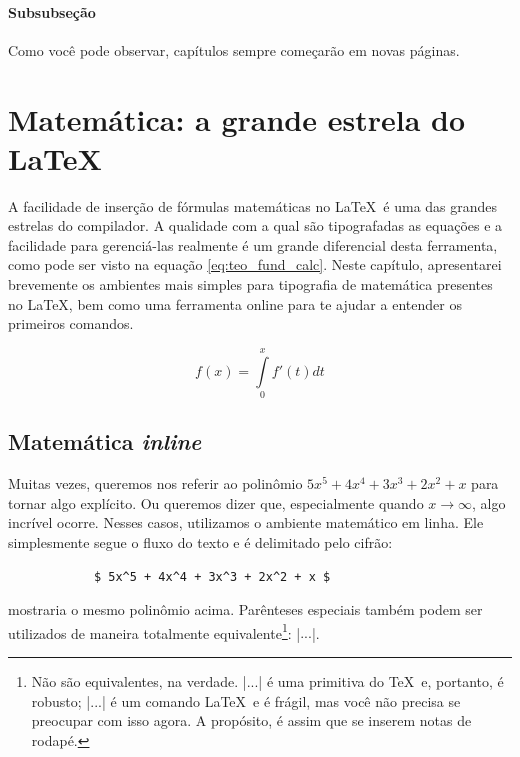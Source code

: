 \documentclass[12pt,oneside,a4paper,english,brazil]{abntex2}
\begin{document}
             \subsubsection{Subsubseção}
                \lipsum[3] %
                
                Como você pode observar, capítulos sempre começarão em novas páginas.


\chapter{Matemática: a grande estrela do \LaTeX}

    A facilidade de inserção de fórmulas matemáticas no \LaTeX\ é uma das grandes estrelas do compilador. A qualidade com a qual são tipografadas as equações e a facilidade para gerenciá-las realmente é um grande diferencial desta ferramenta, como pode ser visto na equação \eqref{eq:teo_fund_calc}. Neste capítulo, apresentarei brevemente os ambientes mais simples para tipografia de matemática presentes no \LaTeX, bem como uma ferramenta online para te ajudar a entender os primeiros comandos.
    
    \begin{equation}\label{eq:teo_fund_calc}
    f(x) = \int\limits_{0}^{x} f'(t) dt
    \end{equation}

    \section{Matemática \emph{inline}}
    
        Muitas vezes, queremos nos referir ao polinômio $ 5x^5 + 4x^4 + 3x^3 + 2x^2 + x $ para tornar algo explícito. Ou queremos dizer que, especialmente quando $ x \to \infty $, algo incrível ocorre. Nesses casos, utilizamos o ambiente matemático em linha. Ele simplesmente segue o fluxo do texto e é delimitado pelo cifrão: 
        \begin{verbatim}
            $ 5x^5 + 4x^4 + 3x^3 + 2x^2 + x $
        \end{verbatim}
        mostraria o mesmo polinômio acima. Parênteses especiais também podem ser utilizados de maneira totalmente equivalente\footnote{Não são equivalentes, na verdade. \ltx|$ ... $| é uma primitiva do \TeX\ e, portanto, é robusto; \ltx|\( ... \)| é um comando \LaTeX\ e é frágil, mas você não precisa se preocupar com isso agora. A propósito, é assim que se inserem notas de rodapé.}: \ltx|\( ... \)|.
    
\end{document}
